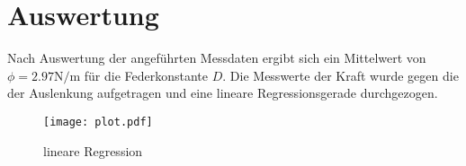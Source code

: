 %

%
\section{Auswertung}
\label{sec:Auswertung}

Nach Auswertung der angeführten Messdaten ergibt sich ein Mittelwert von $\phi = 2.97 \unit{\newton \per \meter}$ für
die Federkonstante $D$.
Die Messwerte der Kraft wurde gegen die der Auslenkung aufgetragen und eine lineare Regressionsgerade durchgezogen.
\begin{figure}
  \centering
  \texttt{[image: plot.pdf]}
  \caption{lineare Regression}
  \label{fig:plot}
\end{figure}

%
